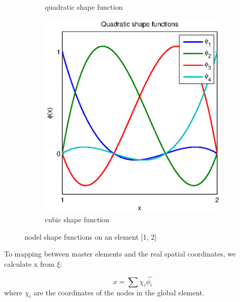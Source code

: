 \documentclass[paper=a4, fontsize=11pt]{article} %
\begin{document}
\begin{figure}
\begin{subfigure}[b]{0.6\textwidth}
                \caption{quadratic shape function}
                \label{fig:quad_shape}
        \end{subfigure}
        \begin{subfigure}[b]{0.6\textwidth}
                \includegraphics[width=\textwidth]{cubic_shape_function.eps}
                \caption{cubic shape function}
                \label{fig:cub_shape}
        \end{subfigure}

        \caption{nodel shape functions on an element [1, 2]}\label{fig:shape}
\end{figure}


To mapping between master elements and the real spatial coordinates, we calculate x from $\xi$:

\begin{equation}
x = \sum{\chi _i \hat{\phi _i}}
\end{equation} 
where $\chi_i$ are the coordinates of the nodes in the global element.  

\end{document}
